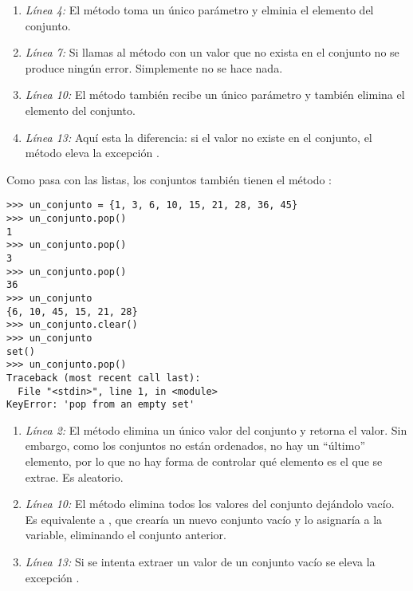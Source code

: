 \begin{enumerate}

\item \emph{Línea 4:} El método  toma un único parámetro y elminia el elemento del conjunto.

\item \emph{Línea 7:} Si llamas al método  con un valor que no exista en el conjunto no se produce ningún error. Simplemente no se hace nada.

\item \emph{Línea 10:} El método  también recibe un único parámetro y también elimina el elemento del conjunto.

\item \emph{Línea 13:} Aquí esta la diferencia: si el valor no existe en el conjunto, el método  eleva la excepción .

\end{enumerate}

Como pasa con las listas, los conjuntos también tienen el método :

\noindent\begin{minipage}{\textwidth}
\begin{lstlisting}[mathescape=True]
>>> un_conjunto = {1, 3, 6, 10, 15, 21, 28, 36, 45}
>>> un_conjunto.pop()
1
>>> un_conjunto.pop()
3
>>> un_conjunto.pop()
36
>>> un_conjunto
{6, 10, 45, 15, 21, 28}
>>> un_conjunto.clear()
>>> un_conjunto
set()
>>> un_conjunto.pop()
Traceback (most recent call last):
  File "<stdin>", line 1, in <module>
KeyError: 'pop from an empty set'
\end{lstlisting}
\end{minipage}

\begin{enumerate}

\item \emph{Línea 2:} El método  elimina un único valor del conjunto y retorna el valor. Sin embargo, como los conjuntos no están ordenados, no hay un ``último'' elemento, por lo que no hay forma de controlar qué elemento es el que se extrae. Es aleatorio.

\item \emph{Línea 10:} El método  elimina todos los valores del conjunto dejándolo vacío. Es equivalente a , que crearía un nuevo conjunto vacío y lo asignaría a la variable, eliminando el conjunto anterior.

\item \emph{Línea 13:} Si se intenta extraer un valor de un conjunto vacío se eleva la excepción . 

\end{enumerate}

